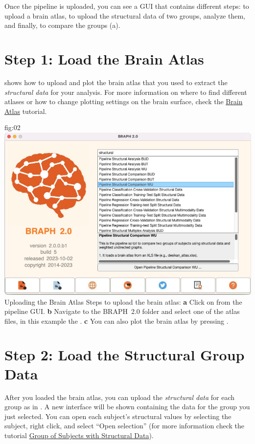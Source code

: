 \documentclass[justified]{tufte-handout}
\begin{document}
Once the pipeline is uploaded, you can see a GUI that contains different steps: to upload a brain atlas, to upload the structural data of two groups, analyze them, and finally, to compare the groups (a). 

\section{Step 1: Load the Brain Atlas}
 shows how to upload and plot the brain atlas that you used to extract the \emph{structural data} for your analysis. For more information on where to find different atlases or how to change plotting settings on the brain surface, check the \href{https://github.com/braph-software/BRAPH-2/tree/develop/tutorials/general/tut_ba}{Brain Atlas} tutorial.

	{fig:02}
	{
	\includegraphics{fig02.jpg}
	}
	{Uploading the Brain Atlas}
	{
	Steps to upload the brain atlas:
	{\bf a} Click on  from the pipeline GUI.
	{\bf b} Navigate to the BRAPH~2.0 folder  and select one of the atlas files, in this example the . {\bf c} You can also plot the brain atlas by pressing . 
	}
 
\section{Step 2: Load the Structural Group Data}

After you loaded the brain atlas, you can upload the \emph{structural data} for each group as in . A new interface will be shown containing the data for the group you just selected. You can open each subject’s structural values by selecting the subject, right click, and select “Open selection” (for more information check the tutorial \href{https://github.com/braph-software/BRAPH-2/tree/develop/tutorials/general/tut_gr_st}{Group of Subjects with Structural Data}).	
\end{document}
